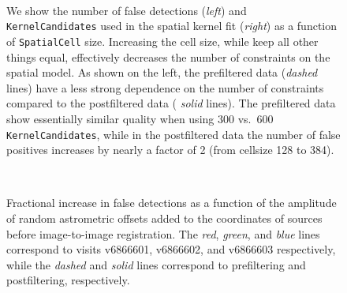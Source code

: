 \documentclass[prd, nofootinbib, floatfix, 11pt,tightenlines,times]{article}
\begin{document}
{\begin{figure}
 \\
\caption{We show the number of false detections ({\it left}) and {\tt
    KernelCandidates} used in the spatial kernel fit ({\it right}) as
  a function of {\tt SpatialCell} size.  Increasing the cell size,
  while keep all other things equal, effectively decreases the number
  of constraints on the spatial model.  As shown on the left, the
  prefiltered data ({\it dashed} lines) have a less strong dependence
  on the number of constraints compared to the postfiltered data ({\it
    solid} lines).  The prefiltered data show essentially similar
  quality when using 300 vs.~600 {\tt KernelCandidates}, while in the
  postfiltered data the number of false positives increases by nearly
  a factor of 2 (from cellsize 128 to 384).  }
\label{cellsize}
\end{figure}

\begin{figure}
 \\
\caption{Fractional increase in false detections as a function of the
  amplitude of random astrometric offsets added to the coordinates of
  sources before image-to-image registration.  The {\it red}, {\it
    green}, and {\it blue} lines correspond to visits v6866601,
  v6866602, and v6866603 respectively, while the {\it dashed} and {\it
    solid} lines correspond to prefiltering and postfiltering,
  respectively.}
\label{wcsrms}
\end{figure}

}
\end{document}
